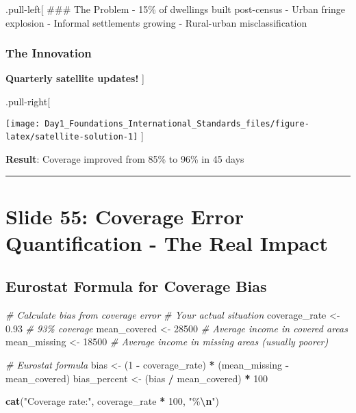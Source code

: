 \documentclass[
]{article}
\newenvironment{Shaded}{\begin{snugshade}}{\end{snugshade}}
\newcommand{\CommentTok}[1]{\textcolor[rgb]{0.56,0.35,0.01}{\textit{#1}}}
\newcommand{\DecValTok}[1]{\textcolor[rgb]{0.00,0.00,0.81}{#1}}
\newcommand{\FloatTok}[1]{\textcolor[rgb]{0.00,0.00,0.81}{#1}}
\newcommand{\FunctionTok}[1]{\textcolor[rgb]{0.13,0.29,0.53}{\textbf{#1}}}
\newcommand{\NormalTok}[1]{#1}
\newcommand{\OtherTok}[1]{\textcolor[rgb]{0.56,0.35,0.01}{#1}}
\newcommand{\SpecialCharTok}[1]{\textcolor[rgb]{0.81,0.36,0.00}{\textbf{#1}}}
\newcommand{\StringTok}[1]{\textcolor[rgb]{0.31,0.60,0.02}{#1}}
\begin{document}
.pull-left{[} \#\#\# The Problem - 15\% of dwellings built post-census -
Urban fringe explosion - Informal settlements growing - Rural-urban
misclassification

\subsubsection{The Innovation}\label{the-innovation}

\textbf{Quarterly satellite updates!} {]}

.pull-right{[}

\texttt{[image: Day1\_Foundations\_International\_Standards\_files/figure-latex/satellite-solution-1]}
{]}

\textbf{Result}: Coverage improved from 85\% to 96\% in 45 days

\begin{center}\rule{0.5\linewidth}{0.5pt}\end{center}

\section{Slide 55: Coverage Error Quantification - The Real
Impact}\label{slide-55-coverage-error-quantification---the-real-impact}

\subsection{Eurostat Formula for Coverage
Bias}\label{eurostat-formula-for-coverage-bias}

\begin{Shaded}
\begin{Highlighting}[]
\CommentTok{\# Calculate bias from coverage error}
\CommentTok{\# Your actual situation}
\NormalTok{coverage\_rate }\OtherTok{\textless{}{-}} \FloatTok{0.93}  \CommentTok{\# 93\% coverage}
\NormalTok{mean\_covered }\OtherTok{\textless{}{-}} \DecValTok{28500}  \CommentTok{\# Average income in covered areas}
\NormalTok{mean\_missing }\OtherTok{\textless{}{-}} \DecValTok{18500}  \CommentTok{\# Average income in missing areas (usually poorer)}

\CommentTok{\# Eurostat formula}
\NormalTok{bias }\OtherTok{\textless{}{-}}\NormalTok{ (}\DecValTok{1} \SpecialCharTok{{-}}\NormalTok{ coverage\_rate) }\SpecialCharTok{*}\NormalTok{ (mean\_missing }\SpecialCharTok{{-}}\NormalTok{ mean\_covered)}
\NormalTok{bias\_percent }\OtherTok{\textless{}{-}}\NormalTok{ (bias }\SpecialCharTok{/}\NormalTok{ mean\_covered) }\SpecialCharTok{*} \DecValTok{100}

\FunctionTok{cat}\NormalTok{(}\StringTok{"Coverage rate:"}\NormalTok{, coverage\_rate }\SpecialCharTok{*} \DecValTok{100}\NormalTok{, }\StringTok{"\%}\SpecialCharTok{\textbackslash{}n}\StringTok{"}\NormalTok{)}
\end{Highlighting}
\end{Shaded}
\end{document}
